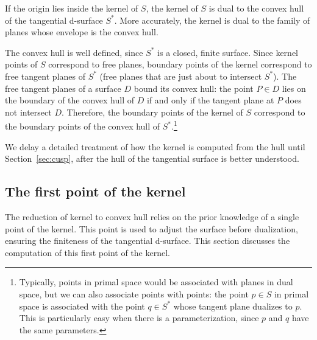 \documentclass[12pt]{article}
\begin{document}
\begin{theorem}
\label{thm:kernelhull}
If the origin lies inside the kernel of $S$,
the kernel of $S$ is dual to the convex hull of the tangential d-surface $S^*$.
More accurately, the kernel is dual to the family of planes whose
envelope is the convex hull.
\end{theorem}
\prf
The convex hull is well defined, since $S^*$ is a closed, finite surface.
Since kernel points of $S$ correspond to free planes,
boundary points of the kernel correspond to free tangent planes of $S^*$
(free planes that are just about to intersect $S^*$).
The free tangent planes of a surface $D$ bound its convex hull: the point $P \in D$ lies
on the boundary of the convex hull of $D$ if and only if the tangent plane at $P$ 
does not intersect $D$.
Therefore, the boundary points of the kernel of $S$ correspond to the boundary points
of the convex hull of $S^*$.\footnote{Typically, points in primal space would be associated with planes in dual space,
	but we can also associate points with points:
	the point $p \in S$ in primal space is associated
	with the point $q \in S^*$ whose tangent plane dualizes to $p$.
	This is particularly easy when there is a parameterization, since $p$ and $q$ 
	have the same parameters.}
\QED

We delay a detailed treatment of how the kernel is computed from the hull
until Section~\ref{sec:cusp}, after the hull of the tangential surface is better understood.


\subsection{The first point of the kernel}
\label{sec:firstpt}

The reduction of kernel to convex hull relies on the prior knowledge
of a single point of the kernel.
This point is used to adjust the surface before dualization, ensuring
the finiteness of the tangential d-surface.
This section discusses the computation of this first point of the kernel.
\end{document}
